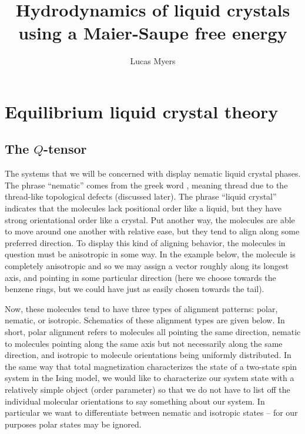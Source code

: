 \documentclass[reqno]{article}
\begin{document}
	\title{Hydrodynamics of liquid crystals using a Maier-Saupe free energy}
	\author{Lucas Myers}
	\maketitle

	\section{Equilibrium liquid crystal theory}
	\subsection{The $Q$-tensor}
  The systems that we will be concerned with display nematic liquid crystal
  phases.
  The phrase ``nematic'' comes from the greek word \textnu\texteta\textmu\textalpha,
  meaning thread due to the thread-like topological defects (discussed later).
  The phrase ``liquid crystal'' indicates that the molecules lack positional
  order like a liquid, but they have strong orientational order like a crystal.
  Put another way, the molecules are able to move around one another with
  relative ease, but they tend to align along some preferred direction.
  To display this kind of aligning behavior, the molecules in question must be
  anisotropic in some way.
  In the example below, the molecule is completely anisotropic and so we may
  assign a vector roughly along its longest axis, and pointing in some
  particular direction (here we choose towards the benzene rings, but we could
  have just as easily chosen towards the tail).

  Now, these molecules tend to have three types of alignment
  patterns: polar, nematic, or isotropic.
  Schematics of these alignment types are given below.
  In short, polar alignment refers to molecules all pointing the same
  direction, nematic to molecules pointing along the same axis but not
  necessarily along the same direction, and isotropic to molecule orientations
  being uniformly distributed.
  In the same way that total magnetization characterizes the state of a
  two-state spin system in the Ising model, we would like to characterize our
  system state with a relatively simple object (order parameter) so that we do not have to list
  off the individual molecular orientations to say something about our system.
  In particular we want to differentiate between nematic and isotropic states --
  for our purposes polar states may be ignored.
\end{document}
